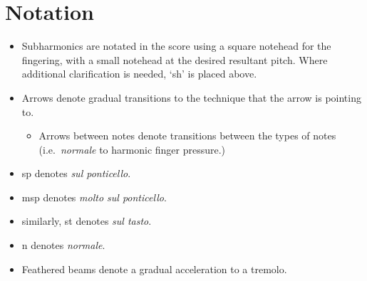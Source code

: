\section*{Notation}
\begin{itemize}

    \item Subharmonics are notated in the score using a square notehead for the fingering, with a small notehead at the desired resultant pitch. Where additional clarification is needed, `sh' is placed above.
    \item Arrows denote gradual transitions to the technique that the arrow is pointing to.\begin{itemize}
        \item Arrows between notes denote transitions between the types of notes (i.e.\ \emph{normale} to harmonic finger pressure.)
      \end{itemize}
    \item sp denotes \emph{sul ponticello}.
    \item msp denotes \emph{molto sul ponticello}.
    \item similarly, st denotes \emph{sul tasto}.
    \item n denotes \emph{normale}.
    \item Feathered beams denote a gradual acceleration to a tremolo.
\end{itemize}

\newpage\label{app:violaPiece Score}

% 
